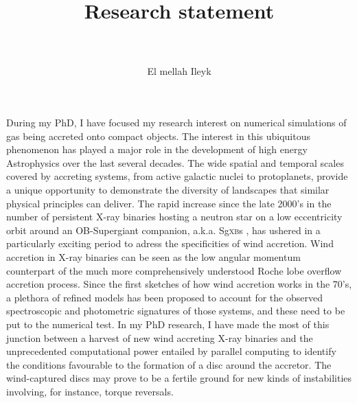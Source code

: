 \documentclass[a4paper,12pt,onecolumn]{article}
\title{	
\vspace*{-2cm}
\normalfont \tiny 
\horrule{0.5pt} \\[0.4cm] %
\huge Research statement \\ %
\horrule{2pt} \\[0.5cm] %
}
\author{E{\sc l mellah} Ileyk} %
\date{\tiny }%
\begin{document}


\maketitle
\thispagestyle{empty}

\indent During my PhD, I have focused my research interest on numerical simulations of gas being accreted onto compact objects. The interest in this ubiquitous phenomenon has played a major role in the development of high energy Astrophysics over the last several decades. The wide spatial and temporal scales covered by accreting systems, from active galactic nuclei to protoplanets, provide a unique opportunity to demonstrate the diversity of landscapes that similar physical principles can deliver. The rapid increase since the late 2000's in the number of persistent X-ray binaries hosting a neutron star on a low eccentricity orbit around an OB-Supergiant companion, a.k.a. Sg\textsc{xb}s \citep{Walter15}, has ushered in a particularly exciting period to adress the specificities of wind accretion. Wind accretion in X-ray binaries can be seen as the low angular momentum counterpart of the much more comprehensively understood Roche lobe overflow accretion process. Since the first sketches of how wind accretion works in the 70's, a plethora of refined models has been proposed to account for the observed spectroscopic and photometric signatures of those systems, and these need to be put to the numerical test. In my PhD research, I have made the most of this junction between a harvest of new wind accreting X-ray binaries and the unprecedented computational power entailed by parallel computing to identify the conditions favourable to the formation of a disc around the accretor. The wind-captured discs may prove to be a fertile ground for new kinds of instabilities involving, for instance, torque reversals.\\
\end{document}
